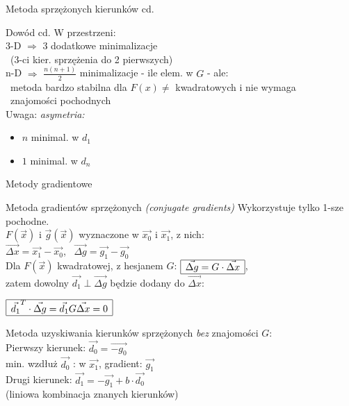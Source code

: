   \begin{frame}{Metoda sprzężonych kierunków cd. }

   \begin{block}{Dowód cd.}
	  W przestrzeni:
	  \smallskip
	  \\3-D $\Rightarrow$ 3 dodatkowe minimalizacje
	  \\ \ (3-ci kier. sprzężenia do 2 pierwszych)
	  \\n-D $\Rightarrow$ $\frac{n(n+1)}{2}$ minimalizacje - ile elem. w $G$ - ale:
	  \\ \ metoda bardzo stabilna dla $F(x) \neq$ kwadratowych i nie wymaga
	  \\ \ znajomości pochodnych
	  \medskip
	  \\Uwaga: \emph{asymetria:}
	  \begin{itemize}
	  	  \item $n$ minimal. w $d_1$
	  	  \item $1$ minimal. w $d_n$
	  \end{itemize}
 	\end{block}

  \end{frame}

  \begin{frame}{Metody gradientowe}

 	\begin{block}{Metoda gradientów sprzężonych \emph{(conjugate gradients)}}
 	   Wykorzystuje tylko 1-sze pochodne.
 	   \medskip
 	   \\ $F(\vec{x})$ i $\vec{g}(\vec{x})$ wyznaczone w $\vec{x_0}$ i $\vec{x_1}$, z nich:
 	   \smallskip
 	   \\ $\vec{\Delta x} = \vec{x_1} - \vec{x_0}$, \ $\vec{\Delta g} = \vec{g_1} - \vec{g_0}$
 	   \smallskip
 	   \\ Dla $F(\vec{x})$ kwadratowej, z hesjanem $G$:
 	   $\begin{array}{|c|}
 	   	  \hline
 	   	  \vec{\Delta g} = G \cdot \vec{\Delta x}
 	   	  \\ \hline
 	   \end{array}$,
 	   \\zatem dowolny $\vec{d_1} \perp \vec{\Delta g}$ będzie dodany do $\vec{\Delta x}$:
 	   \begin{center}
 	      $\begin{array}{|c|}
 	   	    \hline
 	   	    \vec{d_1}^T \cdot \vec{\Delta g} = \vec{d_1} G \vec{\Delta x} = 0
 	   	    \\ \hline
 	      \end{array}$
 	   \end{center}
 	   \smallskip
 	   Metoda uzyskiwania kierunków sprzężonych \emph{bez} znajomości $G$:
 	   \\Pierwszy kierunek: $\vec{d_0} = \vec{-g_0}$
 	   \\min. wzdłuż $\vec{d_0}$ : w $\vec{x_1}$, gradient:  $\vec{g_1}$
 	   \\Drugi kierunek: $\vec{d_1} = -\vec{g_1} + b \cdot \vec{d_0}$
 	   \\(liniowa kombinacja znanych kierunków)
 	\end{block}

  \end{frame}

